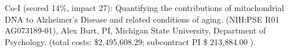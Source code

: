 

\item Co-I (scored 14\%, impact 27): Quantifying the contributions of mitochondrial DNA to Alzheimer's Disease and related conditions of aging. (NIH:PSE R01 AG073189-01), Alex Burt, PI, Michigan State University, Department of Psychology.  (total costs: \$2,495,608.29; subcontract PI \$ 213,884.00 ).

